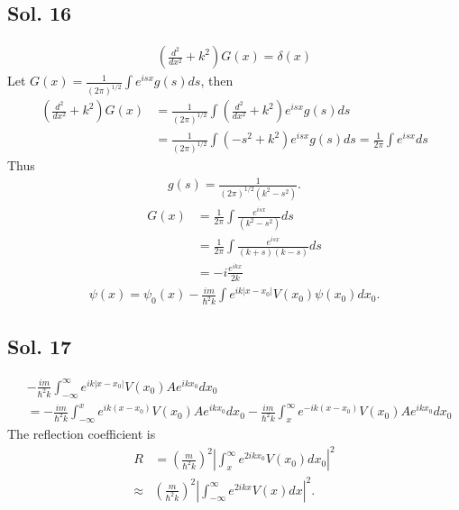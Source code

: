 \subsection*{Sol. 16}
\begin{align*}
    (\frac{d^2}{dx^2} + k^2)G(x) = \delta(x)
\end{align*}
Let $G(x) = \frac{1}{(2\pi)^{1/2}}\int e^{isx}g(s)ds$,
then
\begin{align*}
    (\frac{d^2}{dx^2} + k^2)G(x) & =
    \frac{1}{(2\pi)^{1/2}}\int
    (\frac{d^2}{dx^2} + k^2)e^{isx}g(s)ds \\
                                 & =
    \frac{1}{(2\pi)^{1/2}}\int
    (-s^2 + k^2)e^{isx}g(s)ds =
    \frac{1}{2\pi}\int e^{isx}ds
\end{align*}
Thus
\begin{align*}
    g(s) = \frac{1}{(2\pi)^{1/2}(k^2-s^2)}.
\end{align*}
\begin{align*}
    G(x) & = \frac{1}{2\pi}\int \frac{e^{isx}}{(k^2-s^2)}ds \\
         & = \frac{1}{2\pi}\int \frac{e^{isx}}{(k+s)(k-s)}ds \\
         & = -i\frac{e^{ikx}}{2k}
\end{align*}
\begin{align*}
    \psi(x) = \psi_0(x) - \frac{im}{\hbar^2 k }\int e^{ik|x-x_0|} V(x_0)\psi(x_0)dx_0.
\end{align*}

\subsection*{Sol. 17}
\begin{align*}
     & -\frac{im}{\hbar^2k}
    \int_{-\infty}^{\infty} e^{ik|x-x_0|}V(x_0)Ae^{ikx_0}dx_0 \\
     & =-\frac{im}{\hbar^2k}
    \int_{-\infty}^{x} e^{ik(x-x_0)}V(x_0)Ae^{ikx_0}dx_0
    -\frac{im}{\hbar^2k}
    \int_{x}^{\infty} e^{-ik(x-x_0)}V(x_0)Ae^{ikx_0}dx_0
\end{align*}
The reflection coefficient is
\begin{align*}
    R       & = \left(\frac{m}{\hbar^2k}\right)^2
    \left|
    \int_x^\infty e^{2ikx_0}V(x_0)dx_0
    \right|^2 \\
    \approx &
    \left(\frac{m}{\hbar^2k}\right)^2
    \left|
    \int_{-\infty}^\infty e^{2ikx}V(x)dx
    \right|^2.
\end{align*}

